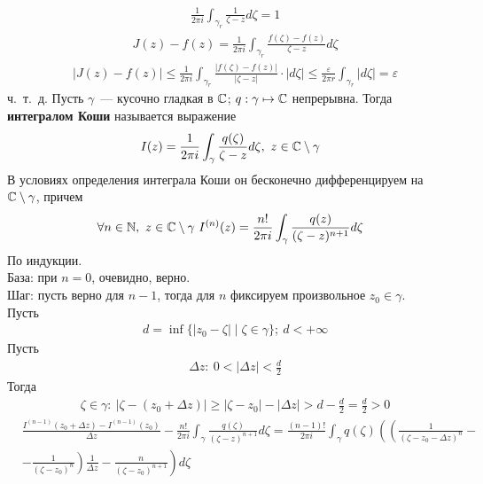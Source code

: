 \begin{align*}
  & \frac{1}{2 \pi i} \int_{\gamma_r} \frac{1}{\zeta - z} d \zeta = 1
\end{align*}
\begin{align*}
  & J(z) - f(z) = \frac{1}{2 \pi i} \int_{\gamma_r} \frac{f(\zeta) - f(z)}{\zeta - z} d \zeta
\end{align*}
\begin{align*}
  & \left| J(z) - f(z) \right| \leq \frac{1}{2 \pi i} \int_{\gamma_r} \frac{\left| f(\zeta) - f(z) \right|}{\left| \zeta - z \right|} \cdot \left| d\zeta \right| \leq \frac{\varepsilon}{2 \pi r} \int_{\gamma_r}\left| d\zeta \right| = \varepsilon
\end{align*}
ч.~т.~д.
\Def
Пусть $\gamma$~--- кусочно гладкая в $\mathbb{C}$; $q: \gamma \mapsto \mathbb{C}$ непрерывна.
Тогда \textbf{интегралом Коши} называется выражение
\begin{equation} \label{(8.2)}
    I(z) = \frac{1}{2 \pi i} \int_{\gamma} \frac{q(\zeta)}{\zeta - z} d\zeta, \ z \in \mathbb{C} \setminus \gamma
\end{equation}
\theorem
В условиях определения интеграла Коши он бесконечно дифференцируем на
$\mathbb{C}\setminus\gamma$, причем
\begin{equation} \label{(8.3)}
    \forall n \in \mathbb{N}, \  z \in \mathbb{C} \setminus \gamma \ I^{(n)}(z) = \frac{n!}{2 \pi i} \int_{\gamma} \frac{q(z)}{(\zeta - z)^{n+1}} d\zeta
\end{equation}
\pr
По индукции.
\\
База: при $n=0$, очевидно, верно.
\\
Шаг: пусть верно для $n-1$, тогда для $n$ фиксируем произвольное $z_0 \in
\gamma$.
\\
Пусть
\begin{align*}
  & d = \inf\{\left| z_0 - \zeta \right| \mid \zeta \in \gamma\}; \ d < +\infty
\end{align*}
Пусть
\begin{align*}
  & \Delta z: \ 0 < \left| \Delta z \right| < \frac{d}{2}
\end{align*}
Тогда
\begin{align*}
  & \zeta \in \gamma: \ \left| \zeta - (z_0+\Delta z)\right| \geq \left| \zeta - z_0 \right| - \left| \Delta z \right| > d - \frac{d}{2} = \frac{d}{2} > 0
\end{align*}
\begin{align*}
  & \frac{I^{(n-1)}(z_0+\Delta z) - I^{(n-1)}(z_0)}{\Delta z} - \frac{n!}{2 \pi i}\int_{\gamma}\frac{q(\zeta)}{(\zeta-z)^{n+1}}d\zeta = \frac{(n-1)!}{2 \pi i}\int_{\gamma}q(\zeta)\left( \left( \frac{1}{(\zeta-z_0-\Delta z)^n} - \right. \right.\\
  & \left. \left. - \frac{1}{(\zeta-z_0)^n} \right)\frac{1}{\Delta z} - \frac{n}{(\zeta-z_0)^{n+1}}\right)d\zeta
\end{align*}
